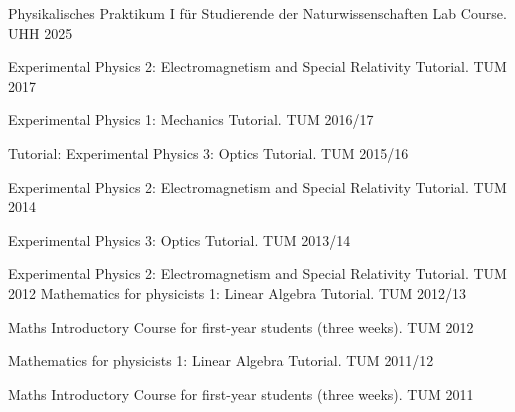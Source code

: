  


\begin{cvhonors}

  \cvhonor
    {Physikalisches Praktikum I für Studierende der Naturwissenschaften} %
    {Lab Course.} %
    {UHH} %
    {2025} %

  \cvhonor
    {Experimental Physics 2: Electromagnetism and Special Relativity} %
    {Tutorial.} %
    {TUM} %
    {2017} %

  \cvhonor
    {Experimental Physics 1: Mechanics} %
    {Tutorial.} %
    {TUM} %
    {2016/17} %

  \cvhonor
    {Tutorial: Experimental Physics 3: Optics} %
    {Tutorial.} %
    {TUM} %
    {2015/16} %

  \cvhonor
    {Experimental Physics 2: Electromagnetism and Special Relativity} %
    {Tutorial.} %
    {TUM} %
    {2014} %

  \cvhonor
    {Experimental Physics 3: Optics} %
    {Tutorial.} %
    {TUM} %
    {2013/14} %

  \cvhonor
    {Experimental Physics 2: Electromagnetism and Special Relativity} %
    {Tutorial.} %
    {TUM} %
    {2012} %
  \cvhonor
    {Mathematics for physicists 1: Linear Algebra} %
    {Tutorial.} %
    {TUM} %
    {2012/13} %

  \cvhonor
    {Maths Introductory Course} %
    {for first-year students (three weeks).} %
    {TUM} %
    {2012} %

  \cvhonor
    {Mathematics for physicists 1: Linear Algebra} %
    {Tutorial.} %
    {TUM} %
    {2011/12} %

  \cvhonor
    {Maths Introductory Course} %
    {for first-year students (three weeks).} %
    {TUM} %
    {2011} %
\end{cvhonors}


